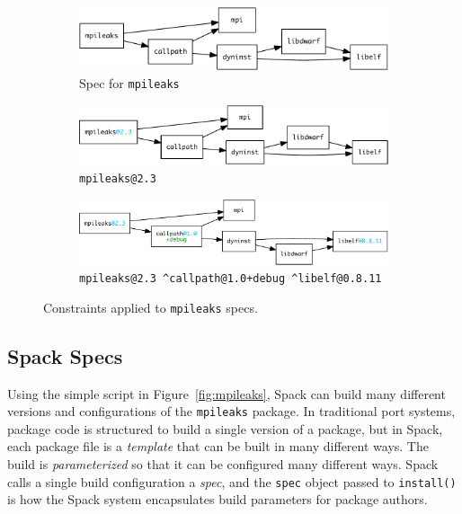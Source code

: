 
\begin{figure}
	\begin{subfigure}{\linewidth}
		\centering
		\includegraphics[width=\columnwidth]{specs/mpileaks.pdf}
		\caption{
			Spec for {\tt mpileaks}
			\label{fig:specs-mpileaks}
		}
	\end{subfigure}
%
	\begin{subfigure}{\linewidth}
		\centering
		\includegraphics[width=\columnwidth]{specs/mpileaks-version}
		\caption{
			{\tt mpileaks@2.3}
			\label{fig:specs-mpileaks-version}
		}
	\end{subfigure}
%
	\begin{subfigure}{\linewidth}
		\centering
		\includegraphics[width=\columnwidth]{specs/mpileaks-abstract.pdf}
		\caption{
			{\tt mpileaks@2.3 \^{}callpath@1.0+debug \^{}libelf@0.8.11}
			\label{fig:specs-mpileaks-abstract}
		}
	\end{subfigure}
%
	\caption{
		Constraints applied to {\tt mpileaks} specs.
	}
	\label{fig:specs}
\end{figure}



\subsection{Spack Specs}\label{sec:specs}

Using the simple script in Figure~\ref{fig:mpileaks}, Spack can build many different
versions and configurations of the {\tt mpileaks} package.  In traditional port systems,
package code is structured to build a single version of a package, but in Spack, each
package file is a {\it template} that can be built in many different ways.  The build is
{\it parameterized} so that it can be configured many different ways.
Spack calls a single build configuration a {\it spec},
 and the {\tt spec} object passed to {\tt install()}
is how the Spack system encapsulates build parameters for package authors.

